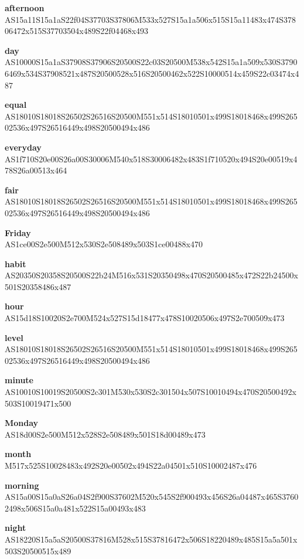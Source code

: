 \documentclass{article}
\begin{document}
\begin{glossary}

\textbf{afternoon}\\
AS15a11S15a1aS22f04S37703S37806M533x527S15a1a506x515S15a11483x474S37806472x515S37703504x489S22f04468x493

\textbf{day}\\
AS10000S15a1aS37908S37906S20500S22c03S20500M538x542S15a1a509x530S37906469x534S37908521x487S20500528x516S20500462x522S10000514x459S22c03474x487

\textbf{equal}\\
AS18010S18018S26502S26516S20500M551x514S18010501x499S18018468x499S26502536x497S26516449x498S20500494x486

\textbf{everyday}\\
AS1f710S20e00S26a00S30006M540x518S30006482x483S1f710520x494S20e00519x478S26a00513x464

\textbf{fair}\\
AS18010S18018S26502S26516S20500M551x514S18010501x499S18018468x499S26502536x497S26516449x498S20500494x486

\textbf{Friday}\\
AS1ce00S2e500M512x530S2e508489x503S1ce00488x470

\textbf{habit}\\
AS20350S20358S20500S22b24M516x531S20350498x470S20500485x472S22b24500x501S20358486x487

\textbf{hour}\\
AS15d18S10020S2e700M524x527S15d18477x478S10020506x497S2e700509x473

\textbf{level}\\
AS18010S18018S26502S26516S20500M551x514S18010501x499S18018468x499S26502536x497S26516449x498S20500494x486

\textbf{minute}\\
AS10010S10019S20500S2c301M530x530S2c301504x507S10010494x470S20500492x503S10019471x500

\textbf{Monday}\\
AS18d00S2e500M512x528S2e508489x501S18d00489x473

\textbf{month}\\
M517x525S10028483x492S20e00502x494S22a04501x510S10002487x476

\textbf{morning}\\
AS15a00S15a0aS26a04S2f900S37602M520x545S2f900493x456S26a04487x465S37602498x506S15a0a481x522S15a00493x483

\textbf{night}\\
AS18220S15a5aS20500S37816M528x515S37816472x506S18220489x485S15a5a501x503S20500515x489


\end{glossary}
\end{document}
